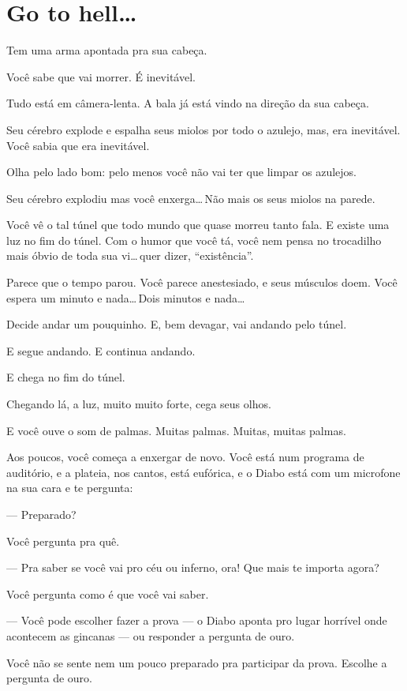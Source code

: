 \chapter{Go to hell\ldots}

Tem uma arma apontada pra sua cabeça.

Você sabe que vai morrer. É inevitável.

Tudo está em câmera-lenta. A bala já está vindo na direção da sua cabeça.

Seu cérebro explode e espalha seus miolos por todo o azulejo, mas, era inevitável. Você sabia que era inevitável.

Olha pelo lado bom: pelo menos você não vai ter que limpar os azulejos.

Seu cérebro explodiu mas você enxerga\ldots\,Não mais os seus miolos na parede.

Você vê o tal túnel que todo mundo que quase morreu tanto fala. E existe uma luz no fim do túnel. Com o humor que você tá, você nem pensa no trocadilho mais óbvio de toda sua vi\ldots\,quer dizer, ``existência''.

Parece que o tempo parou. Você parece anestesiado, e seus músculos doem. Você espera um minuto e nada\ldots\,Dois minutos e nada\ldots

Decide andar um pouquinho. E, bem devagar, vai andando pelo túnel.

E segue andando. E continua andando.

E chega no fim do túnel.

Chegando lá, a luz, muito muito forte, cega seus olhos.

E você ouve o som de palmas. Muitas palmas. Muitas, muitas palmas.

Aos poucos, você começa a enxergar de novo. Você está num programa de auditório, e a plateia, nos cantos, está eufórica, e o Diabo está com um microfone na sua cara e te pergunta:

--- Preparado?

Você pergunta pra quê.

--- Pra saber se você vai pro céu ou inferno, ora! Que mais te importa agora?

Você pergunta como é que você vai saber.

--- Você pode escolher fazer a prova --- o Diabo aponta pro lugar horrível onde acontecem as gincanas --- ou responder a pergunta de ouro.

Você não se sente nem um pouco preparado pra participar da prova. Escolhe a pergunta de ouro.

